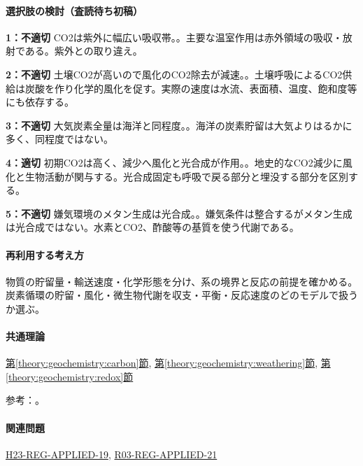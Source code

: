 \paragraph{選択肢の検討（査読待ち初稿）}\mbox{}\par

\noindent\textbf{1：不適切} CO2は紫外に幅広い吸収帯。。主要な温室作用は赤外領域の吸収・放射である。紫外との取り違え。\par

\noindent\textbf{2：不適切} 土壌CO2が高いので風化のCO2除去が減速。。土壌呼吸によるCO2供給は炭酸を作り化学的風化を促す。実際の速度は水流、表面積、温度、飽和度等にも依存する。\par

\noindent\textbf{3：不適切} 大気炭素全量は海洋と同程度。。海洋の炭素貯留は大気よりはるかに多く、同程度ではない。\par

\noindent\textbf{4：適切} 初期CO2は高く、減少へ風化と光合成が作用。。地史的なCO2減少に風化と生物活動が関与する。光合成固定も呼吸で戻る部分と埋没する部分を区別する。\par

\noindent\textbf{5：不適切} 嫌気環境のメタン生成は光合成。。嫌気条件は整合するがメタン生成は光合成ではない。水素とCO2、酢酸等の基質を使う代謝である。\par

\paragraph{再利用する考え方} 物質の貯留量・輸送速度・化学形態を分け、系の境界と反応の前提を確かめる。炭素循環の貯留・風化・微生物代謝を収支・平衡・反応速度のどのモデルで扱うか選ぶ。

\paragraph{共通理論} \hyperref[theory:geochemistry:carbon]{第\ref*{theory:geochemistry:carbon}節}, \hyperref[theory:geochemistry:weathering]{第\ref*{theory:geochemistry:weathering}節}, \hyperref[theory:geochemistry:redox]{第\ref*{theory:geochemistry:redox}節}

\par 参考：\cite{gc_carbon,atm_noaa_ghg,gc_redox}。

\paragraph{関連問題} \hyperref[q:h23-reg-applied-19]{H23-REG-APPLIED-19}, \hyperref[q:r03-reg-applied-21]{R03-REG-APPLIED-21}

